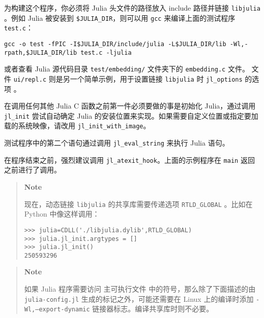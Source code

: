 为构建这个程序，你必须将 Julia 头文件的路径放入 include 路径并链接 \texttt{libjulia} 。例如 Julia 被安装到 \texttt{\$JULIA\_DIR}，则可以用 \texttt{gcc} 来编译上面的测试程序 \texttt{test.c}：




\begin{lstlisting}
gcc -o test -fPIC -I$JULIA_DIR/include/julia -L$JULIA_DIR/lib -Wl,-rpath,$JULIA_DIR/lib test.c -ljulia
\end{lstlisting}



或者查看 Julia 源代码目录 \texttt{test/embedding/} 文件夹下的 \texttt{embedding.c} 文件。 文件 \texttt{ui/repl.c} 则是另一个简单示例，用于设置链接 \texttt{libjulia} 时 \texttt{jl\_options} 的选项 。



在调用任何其他 Julia C 函数之前第一件必须要做的事是初始化 Julia，通过调用 \texttt{jl\_init} 尝试自动确定 Julia 的安装位置来实现。如果需要自定义位置或指定要加载的系统映像，请改用 \texttt{jl\_init\_with\_image}。



测试程序中的第二个语句通过调用 \texttt{jl\_eval\_string} 来执行 Julia 语句。



在程序结束之前，强烈建议调用 \texttt{jl\_atexit\_hook}。上面的示例程序在 \texttt{main} 返回之前进行了调用。



\begin{quote}
\textbf{Note}

现在，动态链接 \texttt{libjulia} 的共享库需要传递选项 \texttt{RTLD\_GLOBAL} 。比如在 Python 中像这样调用：


\begin{lstlisting}
>>> julia=CDLL('./libjulia.dylib',RTLD_GLOBAL)
>>> julia.jl_init.argtypes = []
>>> julia.jl_init()
250593296
\end{lstlisting}

\end{quote}


\begin{quote}
\textbf{Note}

如果 Julia 程序需要访问 主可执行文件 中的符号，那么除了下面描述的由 \texttt{julia-config.jl} 生成的标记之外，可能还需要在 Linux 上的编译时添加 \texttt{-Wl,--export-dynamic} 链接器标志。编译共享库时则不必要。

\end{quote}


\hypertarget{122745226345289239}{}


